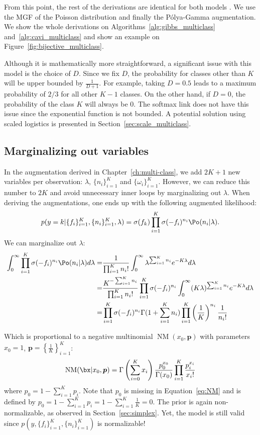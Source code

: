 From this point, the rest of the derivations are identical for both models .
We use the \ac{MGF} of the Poisson distribution and finally the P\'olya-Gamma augmentation.
We show the whole derivations on Algorithms~\ref{alg:gibbs_multiclass} and~\ref{alg:cavi_multiclass} and show an example on Figure~\ref{fig:bijective_multiclass}.

Although it is mathematically more straightforward, a significant issue with this model is the choice of $D$.
Since we fix $D$, the probability for classes other than $K$ will be upper bounded by $\frac{1}{D + 1}$.
For example, taking $D=0.5$ leads to a maximum probability of $2/3$ for all other $K-1$ classes.
On the other hand, if $D=0$, the probability of the class $K$ will always be $0$.
The softmax link does not have this issue since the exponential function is not bounded.
A potential solution using scaled logistics is presented in Section~\ref{sec:scale_multiclass}.

\subsection{Marginalizing out variables}
\label{sec:marg_multiclass}
In the augmentation derived in Chapter~\ref{ch:multi-class}, we add $2K + 1$ new variables per observation: $\lambda$, $\{n_i\}_{i=1}^K$ and $\{\omega_i\}_{i=1}^K$.
However, we can reduce this number to $2K$ and avoid unnecessary inner loops by marginalizing out $\lambda$.
When deriving the augmentations, one ends up with the following augmented likelihood:
\begin{align}
    p(y=k|\{f_i\}_{i=1}^K,\{n_i\}_{i=1}^K,\lambda) = \sigma(f_k) \prod_{i=1}^K \sigma(-f_i)^{n_i} \Po (n_i|\lambda).
\end{align}
We can marginalize out $\lambda$:
\begin{align}
    \int_{0}^\infty \prod_{i=1}^K \sigma(-f_i)^{n_i} \Po (n_i|\lambda)d\lambda =& \frac{1}{\prod_{i=1}^K n_i!}\int_{0}^\infty \lambda^{\sum_{i=1}^K n_i}e^{-K\lambda}d\lambda \nonumber\\
    =& \frac{K^{-\sum_{i=1}^K n_i}}{\prod_{i=1}^K n_i!}\prod_{i=1}^K \sigma(-f_i)^{n_i} \int_{0}^\infty (K\lambda)^{\sum_{i=1}^K n_i}e^{-K\lambda}d\lambda \nonumber\\
    =& \prod_{i=1}^K\sigma(-f_i)^{n_i}\Gamma(1 + \sum_{i=1}^K n_i) \prod_{i=1}^K \left(\frac{1}{K}\right)^{n_i}\frac{1}{n_i!} \label{eq:NM}
\end{align}

Which is proportional to a negative multinomial $\operatorname{NM}(x_0, \boldsymbol{p})$ with parameters $x_0=1$, $\boldsymbol{p}=\left\{\frac{1}{K}\right\}_{i=1}^K$:
\begin{align*}
    \operatorname{NM}(\bx|x_0,\boldsymbol{p}) = \Gamma\left(\sum_{i=0}^K x_i\right) \frac{p_0^{x_0}}{\Gamma(x_0)}\prod_{i=1}^K \frac{p_i^{x_i}}{x_i!}   
\end{align*}
where $p_0 = 1 - \sum_{i=1}^K p_i$.
Note that $p_0$ is missing in Equation~\eqref{eq:NM} and is defined by $p_0= 1 - \sum_{i=1}^K p_i = 1 - \sum_{i=1}^{K}\frac{1}{K} = 0$.
The prior is again non-normalizable, as observed in Section~\ref{sec:simplex}.
Yet, the model is still valid since $p(y,\{f_i\}_{i=1}^K,\{n_i\}_{i=1}^K)$ is normalizable!

